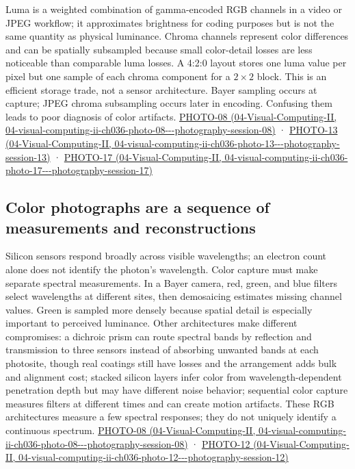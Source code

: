 Luma is a weighted combination of gamma-encoded RGB channels in a video or JPEG workflow; it approximates brightness for coding purposes but is not the same quantity as physical luminance. Chroma channels represent color differences and can be spatially subsampled because small color-detail losses are less noticeable than comparable luma losses. A 4:2:0 layout stores one luma value per pixel but one sample of each chroma component for a \(2\times2\) block. This is an efficient storage trade, not a sensor architecture. Bayer sampling occurs at capture; JPEG chroma subsampling occurs later in encoding. Confusing them leads to poor diagnosis of color artifacts. \href{../04-Visual-Computing-II/main.pdf\#nameddest=04-visual-computing-ii-ch036-photo-08---photography-session-08}{PHOTO-08 (04-Visual-Computing-II, 04-visual-computing-ii-ch036-photo-08-\/-\/-photography-session-08)} · \href{../04-Visual-Computing-II/main.pdf\#nameddest=04-visual-computing-ii-ch036-photo-13---photography-session-13}{PHOTO-13 (04-Visual-Computing-II, 04-visual-computing-ii-ch036-photo-13-\/-\/-photography-session-13)} · \href{../04-Visual-Computing-II/main.pdf\#nameddest=04-visual-computing-ii-ch036-photo-17---photography-session-17}{PHOTO-17 (04-Visual-Computing-II, 04-visual-computing-ii-ch036-photo-17-\/-\/-photography-session-17)}

\subsection{Color photographs are a sequence of measurements and reconstructions}\label{03-visual-computing-i-ch004-color-photographs-are-a-sequence-of-measurements-and-reconstructions}

Silicon sensors respond broadly across visible wavelengths; an electron count alone does not identify the photon's wavelength. Color capture must make separate spectral measurements. In a Bayer camera, red, green, and blue filters select wavelengths at different sites, then demosaicing estimates missing channel values. Green is sampled more densely because spatial detail is especially important to perceived luminance. Other architectures make different compromises: a dichroic prism can route spectral bands by reflection and transmission to three sensors instead of absorbing unwanted bands at each photosite, though real coatings still have losses and the arrangement adds bulk and alignment cost; stacked silicon layers infer color from wavelength-dependent penetration depth but may have different noise behavior; sequential color capture measures filters at different times and can create motion artifacts. These RGB architectures measure a few spectral responses; they do not uniquely identify a continuous spectrum. \href{../04-Visual-Computing-II/main.pdf\#nameddest=04-visual-computing-ii-ch036-photo-08---photography-session-08}{PHOTO-08 (04-Visual-Computing-II, 04-visual-computing-ii-ch036-photo-08-\/-\/-photography-session-08)} · \href{../04-Visual-Computing-II/main.pdf\#nameddest=04-visual-computing-ii-ch036-photo-12---photography-session-12}{PHOTO-12 (04-Visual-Computing-II, 04-visual-computing-ii-ch036-photo-12-\/-\/-photography-session-12)}

